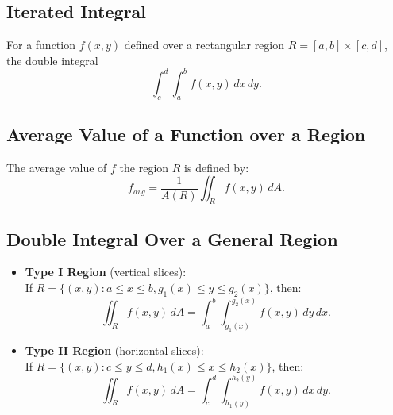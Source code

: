 \documentclass[a4paper,11pt]{article}
\begin{document}


\subsection{Iterated Integral}

\begin{tcolorbox}
    For a function $f(x,y)$ defined over a rectangular region $R=[a,b]\times[c,d]$, the double integral
    \[
    \int_c^d\int_a^b f(x,y) \, dx \, dy.
    \]
\end{tcolorbox}




\subsection{Average Value of a Function over a Region}

\begin{tcolorbox}
    The average value of $f$ the region $R$ is defined by:
    \[
    f_{avg} = \frac{1}{A(R)} \iint_R f(x,y) \, dA.
    \]
\end{tcolorbox}




\subsection{Double Integral Over a General Region}

\begin{tcolorbox}
    \begin{itemize}
        \item \textbf{Type I Region} (vertical slices):\\
        If $R=\{(x,y) : a \leq x \leq b, g_1(x) \leq y \leq g_2(x)\}$, then:
        \[
        \iint_R f(x,y) \, dA = \int_a^b \int_{g_1(x)}^{g_2(x)} f(x,y) \, dy \, dx.
        \]
        \item \textbf{Type II Region} (horizontal slices):\\
        If $R=\{(x,y) : c \leq y \leq d, h_1(x) \leq x \leq h_2(x)\}$, then:
        \[
        \iint_R f(x,y) \, dA = \int_c^d \int_{h_1(y)}^{h_2(y)} f(x,y) \, dx \, dy.
        \]
    \end{itemize}
\end{tcolorbox}
\end{document}
